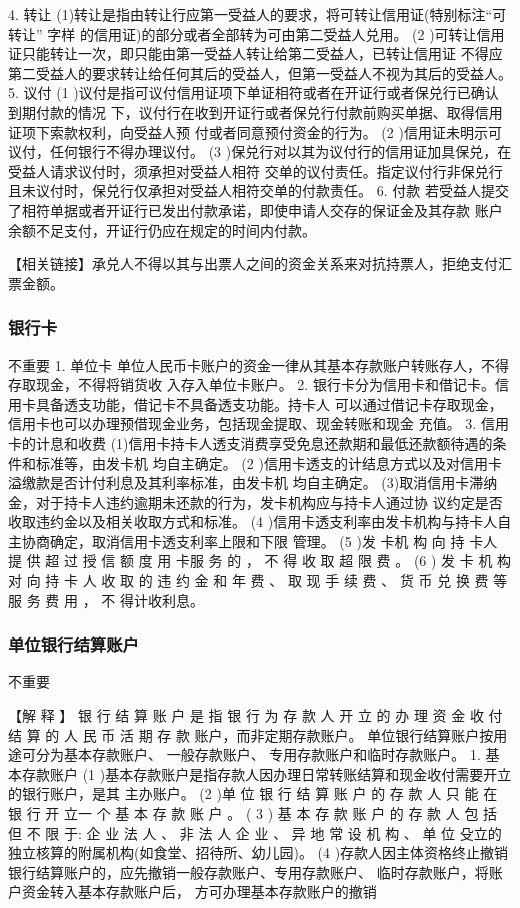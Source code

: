 \documentclass[UTF8,12pt]{ctexart}
\numberwithin{equation}{section} %
\numberwithin{figure}{section}
\numberwithin{table}{section}
\begin{document}
	
	4. 转让
	(1)转让是指由转让行应第一受益人的要求，将可转让信用证(特别标注“可转让” 字样
	的信用证)的部分或者全部转为可由第二受益人兑用。
	(2 )可转让信用证只能转让一次，即只能由第一受益人转让给第二受益人，已转让信用证
	不得应第二受益人的要求转让给任何其后的受益人，但第一受益人不视为其后的受益人。
	5. 议付
	(1 )议付是指可议付信用证项下单证相符或者在开证行或者保兑行已确认到期付款的情况
	下，议付行在收到开证行或者保兑行付款前购买单据、取得信用证项下索款权利，向受益人预
	付或者同意预付资金的行为。
	(2 )信用证未明示可议付，任何银行不得办理议付。
	(3 )保兑行对以其为议付行的信用证加具保兑，在受益人请求议付时，须承担对受益人相符
	交单的议付责任。指定议付行非保兑行且未议付时，保兑行仅承担对受益人相符交单的付款责任。
	6. 付款
	若受益人提交了相符单据或者开证行已发出付款承诺，即使申请人交存的保证金及其存款
	账户余额不足支付，开证行仍应在规定的时间内付款。
	
	
	
	【相关链接】承兑人不得以其与出票人之间的资金关系来对抗持票人，拒绝支付汇票金额。
	
	\subsubsection{银行卡} 
	不重要
	1. 单位卡
	单位人民币卡账户的资金一律从其基本存款账户转账存人，不得存取现金，不得将销货收
	入存入单位卡账户。
	2. 银行卡分为信用卡和借记卡。信用卡具备透支功能，借记卡不具备透支功能。持卡人
	可以通过借记卡存取现金，信用卡也可以办理预借现金业务，包括现金提取、现金转账和现金
	充值。
	3. 信用卡的计息和收费
	(1)信用卡持卡人透支消费享受免息还款期和最低还款额待遇的条件和标准等，由发卡机
	均自主确定。
	(2 )信用卡透支的计结息方式以及对信用卡溢缴款是否计付利息及其利率标准，由发卡机
	均自主确定。
	(3)取消信用卡滞纳金，对于持卡人违约逾期未还款的行为，发卡机构应与持卡人通过协
	议约定是否收取违约金以及相关收取方式和标准。
	(4 )信用卡透支利率由发卡机构与持卡人自主协商确定，取消信用卡透支利率上限和下限
	管理。
	(5 )发 卡机 构 向 持 卡人 提 供 超 过 授 信 额 度 用 卡服 务 的 ， 不 得 收 取 超 限 费 。
	(6 ) 发 卡 机 构 对 向 持 卡 人 收 取 的 违 约 金 和 年 费 、 取 现 手 续 费 、 货 币 兑 换 费 等 服 务 费 用 ， 不
	得计收利息。
	
	\subsubsection{单位银行结算账户} 
	不重要
	
	【解 释 】 银 行 结 算 账 户 是 指 银 行 为 存 款 人 开 立 的 办 理 资 金 收 付 结 算 的 人 民 币 活 期 存 款
	账户，而非定期存款账户。 单位银行结算账户按用途可分为基本存款账户、 一般存款账户、
	专用存款账户和临时存款账户。
	1. 基本存款账户
	(1 )基本存款账户是指存款人因办理日常转账结算和现金收付需要开立的银行账户，是其
	主办账户。
	(2 )单 位 银 行 结 算 账 户 的 存 款 人 只 能 在 银 行 开 立一 个 基 本 存 款 账 户 。
	( 3 ) 基 本 存 款 账 户 的 存 款 人 包 括 但 不 限 于: 企 业 法 人 、 非 法 人 企 业 、 异 地 常 设 机 构 、 单 位
	殳立的独立核算的附属机构(如食堂、招待所、幼儿园)。
	(4 )存款人因主体资格终止撤销银行结算账户的，应先撤销一般存款账户、专用存款账户、
	临时存款账户，将账户资金转入基本存款账户后， 方可办理基本存款账户的撤销
	
\end{document}
